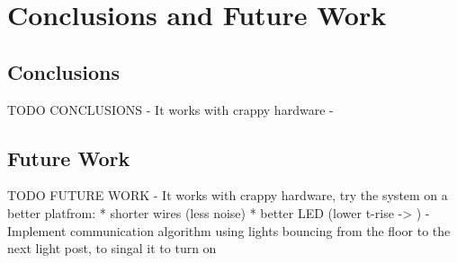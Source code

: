 \chapter{Conclusions and Future Work}
\label{chp:conclusionsandfuturework}

\section{Conclusions}
TODO CONCLUSIONS
 - It works with crappy hardware
 - 

	

\section{Future Work}
TODO FUTURE WORK
- It works with crappy hardware, try the system on a better platfrom:
	* shorter wires (less noise)
	* better LED (lower t-rise ->  )
- Implement communication algorithm using lights bouncing from the floor to the next light post, to singal it to turn on
